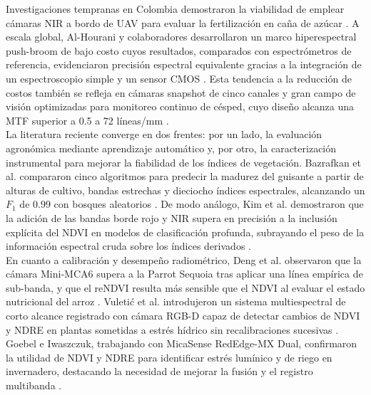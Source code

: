 \noindent Investigaciones tempranas en Colombia demostraron la viabilidad de
emplear cámaras NIR a bordo de UAV para evaluar la fertilización en caña
de azúcar \cite{Navia2016MultispectralUAV}.  A escala global, Al-Hourani
y colaboradores desarrollaron un marco hiperespectral push-broom
de bajo costo cuyos resultados, comparados con espectrómetros de
referencia, evidenciaron precisión espectral equivalente gracias a la
integración de un espectroscopio simple y un sensor CMOS
\cite{Al-Hourani2023LinePlatforms}.  Esta tendencia a la reducción de
costos también se refleja en cámaras snapshot de cinco canales y
gran campo de visión optimizadas para monitoreo continuo de césped, cuyo
diseño alcanza una MTF superior a 0.5 a 72 líneas/mm
\cite{Smeesters2023Wide-Field-of-ViewMonitoring}.\\

\noindent La literatura reciente converge en dos frentes: por un lado, la
evaluación agronómica mediante aprendizaje automático y, por otro, la
caracterización instrumental para mejorar la fiabilidad de los índices
de vegetación.  Bazrafkan et al. compararon cinco algoritmos para predecir
la madurez del guisante a partir de alturas de cultivo, bandas estrechas
y dieciocho índices espectrales, alcanzando un \(F_1\) de 0.99 con
bosques aleatorios \cite{Bazrafkan2023PredictingUASs}.  De modo análogo,
Kim et al. demostraron que la adición de las bandas borde rojo y NIR
supera en precisión a la inclusión explícita del NDVI en modelos de
clasificación profunda, subrayando el peso de la información espectral
cruda sobre los índices derivados \cite{Kim2023DeepClassification}.\\

\noindent En cuanto a calibración y desempeño radiométrico, Deng et al. observaron
que la cámara Mini-MCA6 supera a la Parrot Sequoia tras aplicar una línea
empírica de sub-banda, y que el reNDVI resulta más sensible que el NDVI
al evaluar el estado nutricional del arroz \cite{Deng2018UAV-basedCameras}.
Vuletić et al. introdujeron un sistema multiespectral de corto alcance
registrado con cámara RGB-D capaz de detectar cambios de NDVI y NDRE en
plantas sometidas a estrés hídrico sin recalibraciones sucesivas
\cite{Vuletic2023Close-rangeSystem}.  Goebel e Iwaszczuk, trabajando con
MicaSense RedEdge-MX Dual, confirmaron la utilidad de NDVI y NDRE para
identificar estrés lumínico y de riego en invernadero, destacando la
necesidad de mejorar la fusión y el registro multibanda
\cite{Goebel2023SPECTRALCAMERA}.\\

